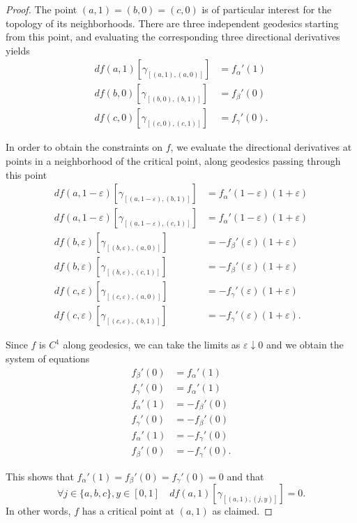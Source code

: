 \documentclass{article}
\theoremstyle{plain}\newtheorem{theorem}{Theorem}[section]
\theoremstyle{plain}\newtheorem{definition}[theorem]{Definition}
\theoremstyle{plain}\newtheorem{lemma}[theorem]{Lemma}
\theoremstyle{definition}\newtheorem{remark}[theorem]{Remark}
\theoremstyle{definition}\newtheorem{example}[theorem]{Example}
\theoremstyle{plain}\newtheorem{proposition}[theorem]{Proposition}
\theoremstyle{plain}\newtheorem{inference}[theorem]{Inference}
\theoremstyle{plain}\newtheorem{corollary}[theorem]{Corollary}
\theoremstyle{plain}\newtheorem{assumption}[theorem]{Assumption}
\begin{document}
\begin{proof}
  The point $(a, 1) = (b, 0) = (c, 0)$ is of particular interest for the
  topology of its neighborhoods. There are three independent geodesics starting
  from this point, and evaluating the corresponding three directional derivatives yields
  \begin{align*}
    df(a, 1)[\gamma_{[(a, 1), (a, 0)]}] &= f_\alpha'(1) \\
    df(b, 0)[\gamma_{[(b, 0), (b, 1)]}] &= f_\beta'(0) \\
    df(c, 0)[\gamma_{[(c, 0), (c, 1)]}] &= f_\gamma'(0).
  \end{align*}

  In order to obtain the constraints on $f$, we evaluate the directional
  derivatives at points in a neighborhood of the critical point, along geodesics
  passing through this point
  \begin{align*}
    df(a, 1-\varepsilon)[\gamma_{[(a, 1-\varepsilon), (b, 1)]}] &= f_\alpha'(1-\varepsilon) (1 + \varepsilon) \\
    df(a, 1-\varepsilon)[\gamma_{[(a, 1-\varepsilon), (c, 1)]}] &= f_\alpha'(1-\varepsilon) (1 + \varepsilon) \\
    df(b, \varepsilon)[\gamma_{[(b, \varepsilon), (a, 0)]}]     &= - f_\beta'(\varepsilon) (1 + \varepsilon) \\
    df(b, \varepsilon)[\gamma_{[(b, \varepsilon), (c, 1)]}]     &= - f_\beta'(\varepsilon) (1 + \varepsilon) \\
    df(c, \varepsilon)[\gamma_{[(c, \varepsilon), (a, 0)]}]     &= - f_\gamma'(\varepsilon) (1 + \varepsilon) \\
    df(c, \varepsilon)[\gamma_{[(c, \varepsilon), (b, 1)]}]     &= - f_\gamma'(\varepsilon) (1 + \varepsilon).
  \end{align*}

  Since $f$ is $C^1$ along geodesics, we can take the limits as $\varepsilon \downarrow 0$ and
  we obtain the system of equations
  \begin{align*}
    f_\beta'(0) &=   f_\alpha'(1) \\
    f_\gamma'(0) &=   f_\alpha'(1) \\
    f_\alpha'(1) &= - f_\beta'(0) \\
    f_\gamma'(0) &= - f_\beta'(0) \\
    f_\alpha'(1) &= - f_\gamma'(0) \\
    f_\beta'(0) &= - f_\gamma'(0).
  \end{align*}

  This shows that $f_\alpha'(1) = f_\beta'(0) = f_\gamma'(0) = 0$ and that
  \begin{equation*}
    \forall j \in \{a, b, c\}, y \in [0, 1]\quad df(a, 1)[\gamma_{[(a, 1), (j, y)]}] = 0.
  \end{equation*}
  In other words, $f$ has a critical point at $(a,1)$ as claimed. 
\end{proof}
\end{document}
